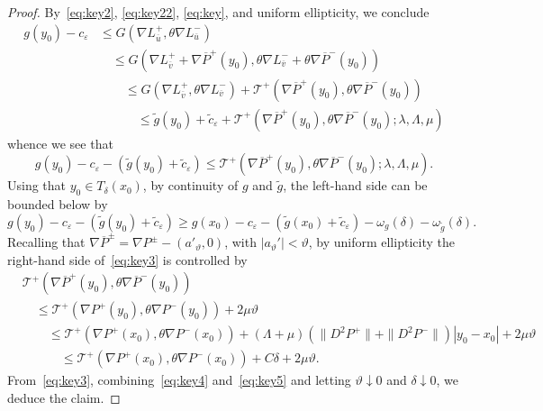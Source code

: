 \documentclass[letter,11pt]{amsart}
\newcommand{\vep}{\varepsilon}
\newcommand{\tcal}{\mathcal{T}}
\theoremstyle{definition}
\numberwithin{equation}{section}
\begin{document}
\begin{proof}
\medskip

By~\eqref{eq:key2}, \eqref{eq:key22}, \eqref{eq:key}, and uniform ellipticity, we conclude
\[
\begin{split}
g(y_0) - c_{\vep} &\leq G(\nabla L_{\overline{u}}^{+}, \theta \nabla L_{\overline{u}}^{-}) 
\\
& \quad \leq G(\nabla L_{\overline{v}}^{+} + \nabla \overline{P}^{+}(y_{0}), \theta \nabla L_{\overline{v}}^{-} + \theta \nabla \overline{P}^{-}(y_{0}))
\\
& \qquad \leq G(\nabla L_{\overline{v}}^{+}, \theta \nabla L_{\overline{v}}^{-})
+ \tcal^{+}(\nabla \overline{P}^{+}(y_{0}), \theta \nabla \overline{P}^{-}(y_{0}))
\\
& \qquad \quad \leq 
\widetilde{g}(y_0) + \widetilde{c}_{\vep}
+ \tcal^{+}(\nabla \overline{P}^{+}(y_0), \theta \nabla \overline{P}^{-}(y_0); \lambda, \Lambda, \mu)
\end{split}
\]
whence we see that
\begin{equation}
\label{eq:key3}
g(y_0) - c_{\vep}  - (\widetilde{g}(y_0) + \widetilde{c}_{\vep})
\leq \tcal^{+}(\nabla \overline{P}^{+}(y_{0}), \theta \nabla \overline{P}^{-}(y_{0}); \lambda, \Lambda, \mu).
\end{equation}
Using that 
$y_0 \in T_{\delta}(x_0)$, 
by continuity of $g$ and $\widetilde{g}$, the left-hand side can be bounded below by
\begin{equation}
\label{eq:key4}
g(y_0) - c_{\vep}  - (\widetilde{g}(y_0) + \widetilde{c}_{\vep})
\geq g(x_0) - c_{\vep}  - (\widetilde{g}(x_0) + \widetilde{c}_{\vep}) - \omega_{g}(\delta)
- \omega_{\widetilde{g}}(\delta).
\end{equation}
Recalling that $\nabla \overline{P}^{\pm} = \nabla P^{\pm} - (a'_{\vartheta}, 0)$, with $|a_{\vartheta}'| < \vartheta$, by uniform ellipticity the right-hand side of~\eqref{eq:key3} is controlled by
\begin{equation}
\label{eq:key5}
\begin{split}
&
\tcal^{+}(\nabla \overline{P}^{+}(y_{0}), \theta \nabla \overline{P}^{-}(y_{0}))
\\
& \quad \leq 
\tcal^{+}(\nabla P^{+}(y_{0}), \theta \nabla P^{-}(y_{0})) 
+ 2 \mu \vartheta\\
& \qquad \leq 
\tcal^{+}(\nabla P^{+}(x_{0}), \theta \nabla P^{-}(x_{0})) 
+ (\Lambda + \mu) \left( 
\|D^2 P^{+}\| + \|D^2 P^{-}\|
\right)|y_0 - x_0|
+ 2 \mu \vartheta\\
& \qquad \quad
\leq 
\tcal^{+}(\nabla P^{+}(x_{0}), \theta \nabla P^{-}(x_{0})) 
+ C \delta
+ 2 \mu \vartheta.
\end{split}
\end{equation}
From~\eqref{eq:key3}, combining~\eqref{eq:key4} and~\eqref{eq:key5} and letting $\vartheta \downarrow 0$ and $\delta \downarrow 0$, we deduce the claim.
\end{proof}
\end{document}
